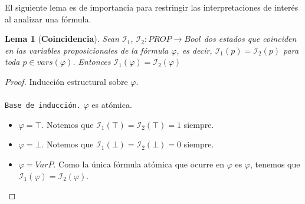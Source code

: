 \documentclass[letterpaper,11pt]{article}
\newtheorem{lema}{Lema}[]
\begin{document}
    \justify
    El siguiente lema es de importancia para restringir las interpretaciones
    de interés al analizar una fórmula.
    \begin{lema} [\textbf{Coincidencia}]
        Sean $\mathcal{I}_{1}$, $\mathcal{I}_{2} : PROP \rightarrow Bool$ dos
        estados que coinciden en las variables proposicionales de la fórmula 
        $\varphi$, es decir, $\mathcal{I}_{1}(p) = \mathcal{I}_{2}(p)$ para 
        toda $p \in vars(\varphi)$. Entonces 
        $\mathcal{I}_{1}(\varphi) = \mathcal{I}_{2}(\varphi)$
    \end{lema}
    \begin{proof}
        Inducción estructural sobre $\varphi$.\\ \\
        \texttt{Base de inducción.} $\varphi$ es atómica.
        \begin{itemize}
            \item $\varphi = \top$. Notemos que 
            $\mathcal{I}_{1}(\top) = \mathcal{I}_{2}(\top) = 1$ siempre.
            \item $\varphi = \bot$. Notemos que 
            $\mathcal{I}_{1}(\bot) = \mathcal{I}_{2}(\bot) = 0$ siempre.
            \item $\varphi = VarP$. Como la única fórmula atómica que ocurre
            en $\varphi$ es $\varphi$, tenemos que 
            $\mathcal{I}_{1}(\varphi) = \mathcal{I}_{2}(\varphi)$.
        \end{itemize}


\end{proof}
\end{document}
